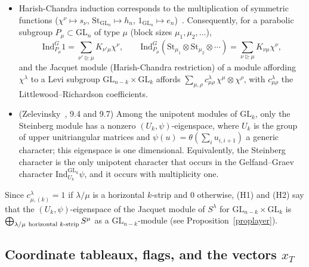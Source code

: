 \documentclass[11pt, letterpaper]{amsart}
\let\amstext\text
\renewcommand{\text}[1]{\amstext{\upshape #1}}%
\theoremstyle{definition}
\theoremstyle{remark}
\newcommand{\GL}{\mathrm{GL}}
\newcommand{\Ind}{\mathrm{Ind}}
\newcommand{\St}{\mathrm{St}}
\begin{document}
\begin{itemize}
\item[(H1)] Harish-Chandra induction corresponds to the multiplication of symmetric functions ($\chi^\nu\mapsto s_\nu$, $\St_{\GL_n}\mapsto h_n$, $1_{\GL_n}\mapsto e_n$)~\cite{G,Z}. Consequently, for a parabolic subgroup $P_\mu\subset\GL_n$ of type $\mu$ (block sizes $\mu_1,\mu_2,\dots$), \[
\Ind_{P_\mu}^G1=\sum_{\nu'\trianglerighteq\mu}K_{\nu'\mu}\chi^\nu,\qquad \Ind_{P_\mu}^G(\St_{\mu_1}\otimes\St_{\mu_2}\otimes\cdots)=\sum_{\nu\trianglerighteq\mu}K_{\nu\mu}\chi^\nu,
\]
and the Jacquet module (Harish-Chandra restriction) of a module affording $\chi^\lambda$ to a Levi subgroup $\GL_{n-k}\times\GL_k$ affords $\sum_{\mu,\rho}c^\lambda_{\mu\rho}\,\chi^\mu\otimes\chi^\rho$, with $c^\lambda_{\mu\rho}$ the Littlewood--Richardson coefficients.
\item[(H2)] (Zelevinsky~\cite{Z}, 9.4 and 9.7) Among the unipotent modules of $\GL_k$, only the Steinberg module has a nonzero $(U_k,\psi)$-eigenspace, where $U_k$ is the group of upper unitriangular matrices and $\psi(u)=\theta(\sum_iu_{i,i+1})$ a generic character; this eigenspace is one dimensional. Equivalently, the Steinberg character is the only unipotent character that occurs in the Gelfand--Graev character $\Ind_{U_k}^{\GL_k}\psi$, and it occurs with multiplicity one.
\end{itemize}
Since $c^\lambda_{\mu,(k)}=1$ if $\lambda/\mu$ is a horizontal $k$-strip and $0$ otherwise, (H1) and (H2) say that the $(U_k,\psi)$-eigenspace of the Jacquet module of $S^\lambda$ for $\GL_{n-k}\times\GL_k$ is $\bigoplus_{\lambda/\mu\ \text{horizontal $k$-strip}}S^\mu$ as a $\GL_{n-k}$-module (see Proposition~\ref{proplayer}).

\subsection{Coordinate tableaux, flags, and the vectors \texorpdfstring{$x_T$}{xT}}\label{subflags}
\end{document}
